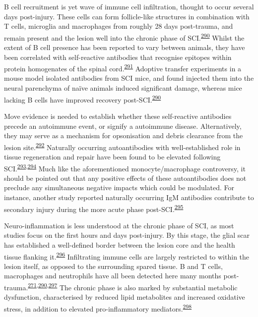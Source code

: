\documentclass[
]{article}
\begin{document}
B cell recruitment is yet wave of immune cell infiltration, thought to occur several days post-injury.
These cells can form follicle-like structures in combination with T cells, microglia and macrophages from roughly 28 days post-trauma, and remain present and the lesion well into the chronic phase of SCI.\textsuperscript{\protect\hyperlink{ref-ankeny_b_2009}{290}}
Whilst the extent of B cell presence has been reported to vary between animals, they have been correlated with self-reactive antibodies that recognise epitopes within protein homogenates of the spinal cord.\textsuperscript{\protect\hyperlink{ref-sun_gammadelta_2017}{291}}
Adoptive transfer experiments in a mouse model isolated antibodies from SCI mice, and found injected them into the neural parenchyma of naïve animals induced significant damage, whereas mice lacking B cells have improved recovery post-SCI.\textsuperscript{\protect\hyperlink{ref-ankeny_b_2009}{290}}

Move evidence is needed to establish whether these self-reactive antibodies precede an autoimmune event, or signify a autoimmune disease.
Alternatively, they may serve as a mechanism for opsonisation and debris clearance from the lesion site.\textsuperscript{\protect\hyperlink{ref-nagele_natural_2013}{292}}
Naturally occurring autoantibodies with well-established role in tissue regeneration and repair have been found to be elevated following SCI.\textsuperscript{\protect\hyperlink{ref-palmers_antibody_2016}{293},\protect\hyperlink{ref-arevalo-martin_elevated_2018}{294}}
Much like the aforementioned monocyte/macrophage controversy, it should be pointed out that any positive effects of these autoantibodies does not preclude any simultaneous negative impacts which could be modulated.
For instance, another study reported naturally occurring IgM antibodies contribute to secondary injury during the more acute phase post-SCI.\textsuperscript{\protect\hyperlink{ref-narang_natural_2017}{295}}

Neuro-inflammation is less understood at the chronic phase of SCI, as most studies focus on the first hours and days post-injury.
By this stage, the glial scar has established a well-defined border between the lesion core and the health tissue flanking it.\textsuperscript{\protect\hyperlink{ref-sofroniew_astrocytes_2010}{296}}
Infiltrating immune cells are largely restricted to within the lesion itself, as opposed to the surrounding spared tissue.
B and T cells, macrophages and neutrophils have all been detected here many months post-trauma.\textsuperscript{\protect\hyperlink{ref-beck_quantitative_2010}{271},\protect\hyperlink{ref-ankeny_b_2009}{290},\protect\hyperlink{ref-pruss_non-resolving_2011}{297}}
The chronic phase is also marked by substantial metabolic dysfunction, characterised by reduced lipid metabolites and increased oxidative stress, in addition to elevated pro-inflammatory mediators.\textsuperscript{\protect\hyperlink{ref-dulin_licofelone_2013}{298}}
\end{document}
